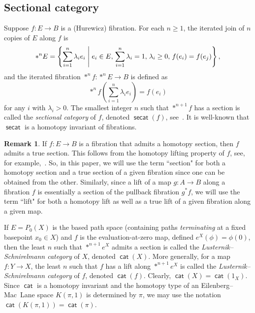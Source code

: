 \documentclass[amscd,amssymb,verbatim,11pt]{amsart}
\theoremstyle{plain}
\theoremstyle{definition}
\newtheorem{remark}[thm]{Remark}
\DeclareMathOperator{\cat}{{\mathsf{cat}}}
\DeclareMathOperator{\secat}{{\mathsf{secat}}}
\begin{document}
\subsection{Sectional category}\label{subsec:secat section}
Suppose $f:E\to B$ is a (Hurewicz) fibration. For each $n \ge 1$, the iterated join of $n$ copies of $E$ along $f$ is
\[
\ast^n E = \left\{\sum_{i=1}^{n} \lambda_{i} e_{i} \hspace{1mm} \middle| \hspace{1mm} e_{i} \in E, \hspace{0.5mm} \sum_{i=1}^{n}\lambda_{i} = 1, \hspace{0.5mm} \lambda_{i} \geq 0, \hspace{0.5mm} f(e_{i})= f(e_{j})\right\},
\]
and the iterated fibration $\ast^nf : \ast^nE \to B$ is defined as
\[
\ast^n f \left(\sum_{i=1}^{n} \lambda_{i} e_{i}\right) = f(e_i)
\]
for any $i$ with $\lambda_{i} > 0$. The smallest integer $n$ such that $\ast^{n+1}f$ has a section is called the \emph{sectional category} of $f$, denoted $\secat(f)$, see~\cite{Sch}. It is well-known that $\secat$ is a homotopy invariant of fibrations.

\begin{remark}\label{rmk:homotopy section}
    If $f:E\to B$ is a fibration that admits a homotopy section, then $f$ admits a true section. This follows from the homotopy lifting property of $f$, see, for example,~\cite[Exercise 1.22]{CLOT}. So, in this paper, we will use the term ``section" for both a homotopy section and a true section of a given fibration since one can be obtained from the other. Similarly, since a lift of a map $g:A\to B$ along a fibration $f$ is essentially a section of the pullback fibration $g^*f$, we will use the term ``lift" for both a homotopy lift as well as a true lift of a given fibration along a given map.
\end{remark}

If $E=P_0(X)$ is the based path space (containing paths \emph{terminating} at a fixed basepoint $x_0 \in X$) and $f$ is the evaluation-at-zero map, defined $e^X(\phi)=\phi(0)$, then the least $n$ such that $\ast^{n+1}e^X$ admits a section is called the \emph{Lusternik--Schnirelmann category} of $X$, denoted $\cat(X)$. More generally, for a map $f:Y\to X$, the least $n$ such that $f$ has a lift along $\ast^{n+1}e^X$ is called the \emph{Lusternik--Schnirelmann category} of $f$, denoted $\cat(f)$. Clearly, $\cat(X)=\cat(1_X)$. Since $\cat$ is a homotopy invariant and the
homotopy type of an Eilenberg--Mac~Lane space $K(\pi,1)$ is determined by $\pi$, we 
may use the notation $\cat(K(\pi,1)) = \cat(\pi)$.
\end{document}
